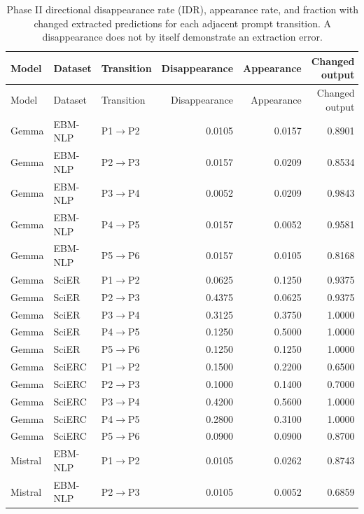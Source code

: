 \documentclass[fleqn,10pt]{wlscirep-authoryear}
\begin{document}
\begingroup
\footnotesize
\setlength{\tabcolsep}{4pt}
\setlength{\LTleft}{0pt}
\setlength{\LTright}{0pt}
\begin{longtable}{lllrrr}
\caption{Phase II directional disappearance rate (IDR), appearance rate, and fraction with changed extracted predictions for each adjacent prompt transition. A disappearance does not by itself demonstrate an extraction error.}\label{tab:r1-idr-full}\\
\toprule
Model & Dataset & Transition & Disappearance & Appearance & Changed output \\
\midrule
\endfirsthead
\toprule
Model & Dataset & Transition & Disappearance & Appearance & Changed output \\
\midrule
\endhead
\bottomrule
\endfoot
Gemma & EBM-NLP & P1$\rightarrow$P2 & 0.0105 & 0.0157 & 0.8901 \\
Gemma & EBM-NLP & P2$\rightarrow$P3 & 0.0157 & 0.0209 & 0.8534 \\
Gemma & EBM-NLP & P3$\rightarrow$P4 & 0.0052 & 0.0209 & 0.9843 \\
Gemma & EBM-NLP & P4$\rightarrow$P5 & 0.0157 & 0.0052 & 0.9581 \\
Gemma & EBM-NLP & P5$\rightarrow$P6 & 0.0157 & 0.0105 & 0.8168 \\
\addlinespace[2pt]
Gemma & SciER & P1$\rightarrow$P2 & 0.0625 & 0.1250 & 0.9375 \\
Gemma & SciER & P2$\rightarrow$P3 & 0.4375 & 0.0625 & 0.9375 \\
Gemma & SciER & P3$\rightarrow$P4 & 0.3125 & 0.3750 & 1.0000 \\
Gemma & SciER & P4$\rightarrow$P5 & 0.1250 & 0.5000 & 1.0000 \\
Gemma & SciER & P5$\rightarrow$P6 & 0.1250 & 0.1250 & 1.0000 \\
\addlinespace[2pt]
Gemma & SciERC & P1$\rightarrow$P2 & 0.1500 & 0.2200 & 0.6500 \\
Gemma & SciERC & P2$\rightarrow$P3 & 0.1000 & 0.1400 & 0.7000 \\
Gemma & SciERC & P3$\rightarrow$P4 & 0.4200 & 0.5600 & 1.0000 \\
Gemma & SciERC & P4$\rightarrow$P5 & 0.2800 & 0.3100 & 1.0000 \\
Gemma & SciERC & P5$\rightarrow$P6 & 0.0900 & 0.0900 & 0.8700 \\
\addlinespace[2pt]
Mistral & EBM-NLP & P1$\rightarrow$P2 & 0.0105 & 0.0262 & 0.8743 \\
Mistral & EBM-NLP & P2$\rightarrow$P3 & 0.0105 & 0.0052 & 0.6859 \\

\end{longtable}
\end{document}
